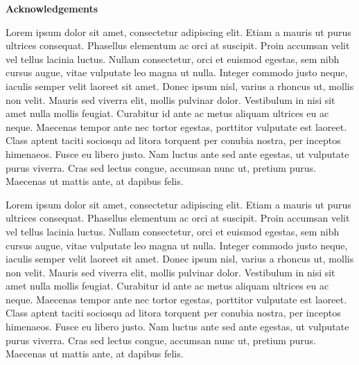 \documentclass[../../main.tex]{subfiles}
\begin{document}
\thispagestyle{empty}
\newenvironment{acknowledgements}%
    {\cleardoublepage\thispagestyle{empty}\null\vfill\begin{center}%
    \vspace{0pt}
    \bfseries Acknowledgements\end{center}}%
    {\vfill\null}
        \begin{acknowledgements}
Lorem ipsum dolor sit amet, consectetur adipiscing elit. Etiam a mauris ut purus ultrices consequat. Phasellus elementum ac orci at suscipit. Proin accumsan velit vel tellus lacinia luctus. Nullam consectetur, orci et euismod egestas, sem nibh cursus augue, vitae vulputate leo magna ut nulla. Integer commodo justo neque, iaculis semper velit laoreet sit amet. Donec ipsum nisl, varius a rhoncus ut, mollis non velit. Mauris sed viverra elit, mollis pulvinar dolor. Vestibulum in nisi sit amet nulla mollis feugiat. Curabitur id ante ac metus aliquam ultrices eu ac neque. Maecenas tempor ante nec tortor egestas, porttitor vulputate est laoreet. Class aptent taciti sociosqu ad litora torquent per conubia nostra, per inceptos himenaeos. Fusce eu libero justo. Nam luctus ante sed ante egestas, ut vulputate purus viverra. Cras sed lectus congue, accumsan nunc ut, pretium purus. Maecenas ut mattis ante, at dapibus felis.

Lorem ipsum dolor sit amet, consectetur adipiscing elit. Etiam a mauris ut purus ultrices consequat. Phasellus elementum ac orci at suscipit. Proin accumsan velit vel tellus lacinia luctus. Nullam consectetur, orci et euismod egestas, sem nibh cursus augue, vitae vulputate leo magna ut nulla. Integer commodo justo neque, iaculis semper velit laoreet sit amet. Donec ipsum nisl, varius a rhoncus ut, mollis non velit. Mauris sed viverra elit, mollis pulvinar dolor. Vestibulum in nisi sit amet nulla mollis feugiat. Curabitur id ante ac metus aliquam ultrices eu ac neque. Maecenas tempor ante nec tortor egestas, porttitor vulputate est laoreet. Class aptent taciti sociosqu ad litora torquent per conubia nostra, per inceptos himenaeos. Fusce eu libero justo. Nam luctus ante sed ante egestas, ut vulputate purus viverra. Cras sed lectus congue, accumsan nunc ut, pretium purus. Maecenas ut mattis ante, at dapibus felis.
        \end{acknowledgements}
\end{document}
